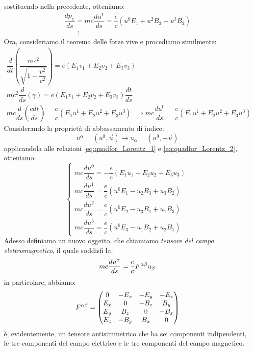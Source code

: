 sostituendo nella precedente, otteniamo:
\begin{equation}  \label{eq:quadfor_Lorentz_1}
    \begin{gathered}
    \dfrac{dp_x}{ds}=mc \dfrac{du^1}{ds}=\dfrac{e}{c}(u^0E_1+ u^2B_3-u^3B_2)
    \\
    \qquad \vdots
     \end{gathered}
\end{equation}
Ora, consideriamo il teorema delle forze vive  e procediamo similmente:
\begin{equation}
\begin{gathered}\label{eq:quadfor_Lorentz_2}
  \dfrac{d}{dt}\left(\dfrac{mc^2}{\sqrt{1-\dfrac{v^2}{c^2}}}\right)=e(E_1v_1+E_2v_2+E_3v_3)
  \\
  mc^2\dfrac{d}{ds}(\gamma)=e(E_1v_1+E_2v_2+E_3v_3)\dfrac{dt}{ds}
  \\
  mc\dfrac{d}{ds}\left(\dfrac{cdt}{ds}\right)=\dfrac{e}{c}(E_1u^1+E_2u^2+E_3u^3) \implies mc\dfrac{du^0}{ds}=\dfrac{e}{c}(E_1u^1+E_2u^2+E_3u^3) 
\end{gathered}
\end{equation}
Considerando la proprietà di abbassamento di indice:
\begin{equation*}
u^\alpha=(u^0,\Vec{u}) \rightarrow u_\alpha=(u^0,-\Vec{u})
\end{equation*}
applicandola alle relazioni \eqref{eq:quadfor_Lorentz_1} e \eqref{eq:quadfor_Lorentz_2}, otteniamo:
\begin{equation}
    \begin{cases}
     mc\dfrac{du^0}{ds}=-\dfrac{e}{c}(E_1u_1+E_2u_2+E_3u_3) 
    \\
    mc \dfrac{du^1}{ds}=\dfrac{e}{c}(u^0E_1 -u_2B_3+u_3B_2)
    \\
    mc \dfrac{du^2}{ds}=\dfrac{e}{c}(u^0E_2 -u_3B_1+u_1B_3)
    \\
    mc \dfrac{du^3}{ds}=\dfrac{e}{c}(u^0E_3 -u_1B_2+u_2B_1)
    \end{cases}\, 
\end{equation}
Adesso definiamo un nuovo oggetto, che chiamiamo \textit{tensore del campo elettromagnetico}, il quale soddisfi la: 
\begin{equation}\label{eq:dinam_parti}
    mc\dfrac{du^\alpha}{ds}=\dfrac{e}{c}F\indices{^{\alpha\beta}}u_\beta
\end{equation}
in particolare, abbiamo:
\begin{equation}
F\indices{^{\alpha\beta}}=
\begin{pmatrix}
  0 & -E_x & -E_y & -E_z  \\
  E_x & 0 & -B_z & B_y  \\
  E_y & B_z & 0 & -B_x  \\
  E_z & -B_y & B_x & 0
\end{pmatrix}
\end{equation}
è, evidentemente, un tensore antisimmetrico che ha sei componenti indipendenti, le tre componenti del campo elettrico e le tre componenti del campo magnetico.

